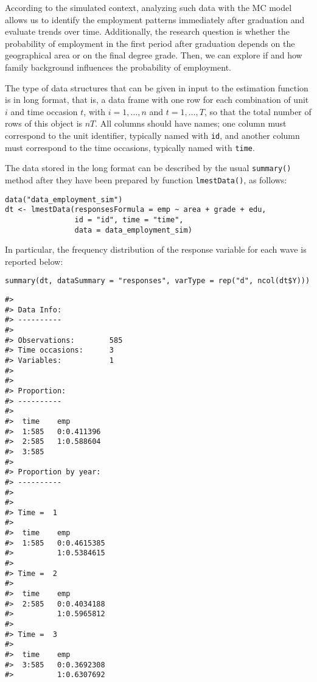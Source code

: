 According to the simulated context, analyzing such data with the MC
model allows us to identify the employment patterns immediately after
graduation and evaluate trends over time. Additionally, the research
question is whether the probability of employment in the first period
after graduation depends on the geographical area or on the final degree
grade. Then, we can explore if and how family background influences the
probability of employment.

The type of data structures that can be given in input to the estimation
function is in long format, that is, a data frame with one row for each
combination of unit \(i\) and time occasion \(t\), with \(i=1,\ldots, n\) and
\(t = 1,\ldots, T\), so that the total number of rows of this object is
\(n T\). All columns should have names; one column must correspond to the
unit identifier, typically named with \texttt{id}, and another column must
correspond to the time occasions, typically named with \texttt{time}.

The data stored in the long format can be described by the usual
\texttt{summary()} method after they have been prepared by function
\texttt{lmestData()}, as follows:

\begin{verbatim}
data("data_employment_sim")
dt <- lmestData(responsesFormula = emp ~ area + grade + edu,          
                id = "id", time = "time", 
                data = data_employment_sim)
\end{verbatim}

In particular, the frequency distribution of the response variable for
each wave is reported below:

\begin{verbatim}
summary(dt, dataSummary = "responses", varType = rep("d", ncol(dt$Y)))
\end{verbatim}

\begin{verbatim}
#> 
#> Data Info:
#> ---------- 
#> 
#> Observations:        585 
#> Time occasions:      3 
#> Variables:           1 
#> 
#> 
#> Proportion:
#> ---------- 
#> 
#>  time    emp       
#>  1:585   0:0.411396
#>  2:585   1:0.588604
#>  3:585             
#> 
#> Proportion by year:
#> ---------- 
#> 
#> 
#> Time =  1 
#> 
#>  time    emp        
#>  1:585   0:0.4615385
#>          1:0.5384615
#> 
#> Time =  2 
#> 
#>  time    emp        
#>  2:585   0:0.4034188
#>          1:0.5965812
#> 
#> Time =  3 
#> 
#>  time    emp        
#>  3:585   0:0.3692308
#>          1:0.6307692
\end{verbatim}

